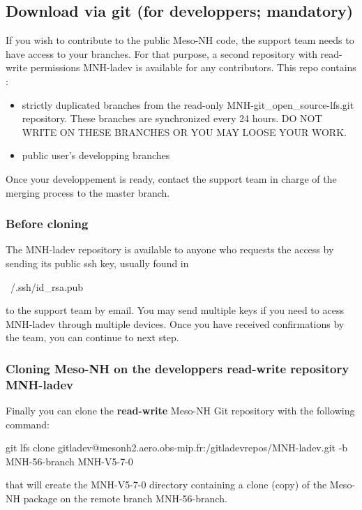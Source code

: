 \subsection{Download via git (for developpers; mandatory)}
\label{sec:dev_sec}
If you wish to contribute to the public Meso-NH code, the support team needs to have access to your branches. For that purpose, a second repository with read-write permissions MNH-ladev is available for any contributors. This repo contains :
\begin{itemize}
    \item strictly duplicated branches from the read-only MNH-git\_open\_source-lfs.git repository. These branches are synchronized every 24 hours. DO NOT WRITE ON THESE BRANCHES OR YOU MAY LOOSE YOUR WORK.
    \item public user's developping branches
\end{itemize}

Once your developpement is ready, contact the support team in charge of the merging process to the master branch.
\subsubsection{Before cloning}
The MNH-ladev repository is available to anyone who requests the access by sending its public ssh key, usually found in 
\begin{bashcode}
    ~/.ssh/id_rsa.pub
\end{bashcode}
to the support team by email. You may send multiple keys if you need to acess MNH-ladev through multiple devices.
Once you have received confirmations by the team, you can continue to next step.

\subsubsection{Cloning Meso-NH on the developpers read-write repository MNH-ladev}
Finally you can clone the \textbf{read-write} Meso-NH Git repository with the following command:
\begin{bashcode}
git lfs clone gitladev@mesonh2.aero.obs-mip.fr:/gitladevrepos/MNH-ladev.git -b MNH-56-branch MNH-V5-7-0
\end{bashcode}

that will create the MNH-V5-7-0 directory containing a clone (copy) of the Meso-NH package on the remote branch MNH-56-branch.

